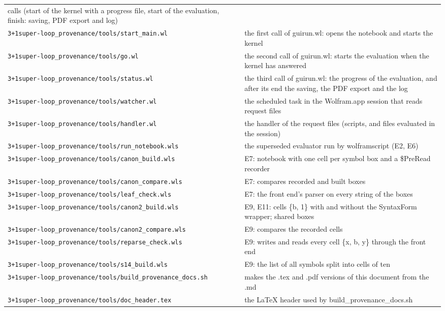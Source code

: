 \documentclass[
  10pt,
]{article}
\begin{document}
\begin{longtable}[]{@{}
  >{\raggedright\arraybackslash}p{}
  >{\raggedright\arraybackslash}p{}@{}}
calls (start of the kernel with a progress file, start of the
evaluation, finish: saving, PDF export and log) \\
\texttt{3+1super-loop\_provenance/tools/start\_main.wl} & the first call
of guirun.wl: opens the notebook and starts the kernel \\
\texttt{3+1super-loop\_provenance/tools/go.wl} & the second call of
guirun.wl: starts the evaluation when the kernel has answered \\
\texttt{3+1super-loop\_provenance/tools/status.wl} & the third call of
guirun.wl: the progress of the evaluation, and after its end the saving,
the PDF export and the log \\
\texttt{3+1super-loop\_provenance/tools/watcher.wl} & the scheduled task
in the Wolfram.app session that reads request files \\
\texttt{3+1super-loop\_provenance/tools/handler.wl} & the handler of the
request files (scripts, and files evaluated in the session) \\
\texttt{3+1super-loop\_provenance/tools/run\_notebook.wls} & the
superseded evaluator run by wolframscript (E2, E6) \\
\texttt{3+1super-loop\_provenance/tools/canon\_build.wls} & E7: notebook
with one cell per symbol box and a \$PreRead recorder \\
\texttt{3+1super-loop\_provenance/tools/canon\_compare.wls} & E7:
compares recorded and built boxes \\
\texttt{3+1super-loop\_provenance/tools/leaf\_check.wls} & E7: the front
end's parser on every string of the boxes \\
\texttt{3+1super-loop\_provenance/tools/canon2\_build.wls} & E9, E11:
cells \{b, 1\} with and without the SyntaxForm wrapper; shared boxes \\
\texttt{3+1super-loop\_provenance/tools/canon2\_compare.wls} & E9:
compares the recorded cells \\
\texttt{3+1super-loop\_provenance/tools/reparse\_check.wls} & E9: writes
and reads every cell \{x, b, y\} through the front end \\
\texttt{3+1super-loop\_provenance/tools/s14\_build.wls} & E9: the list
of all symbols split into cells of ten \\
\texttt{3+1super-loop\_provenance/tools/build\_provenance\_docs.sh} &
makes the .tex and .pdf versions of this document from the .md \\
\texttt{3+1super-loop\_provenance/tools/doc\_header.tex} & the LaTeX
header used by build\_provenance\_docs.sh \\

\end{longtable}
\end{document}
